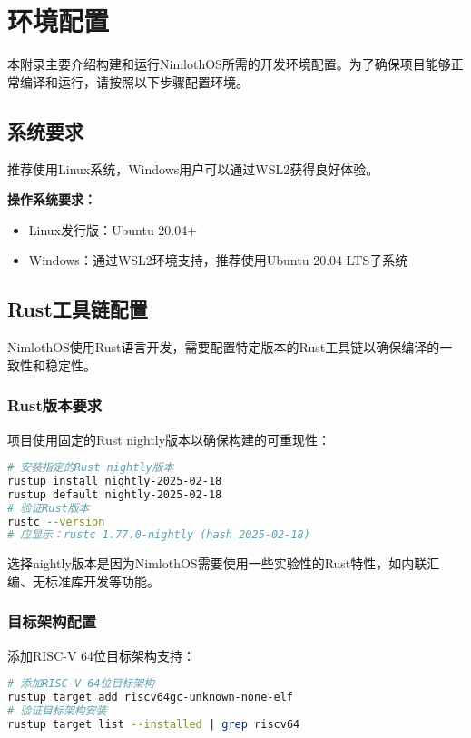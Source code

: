 \chapter{环境配置}

本附录主要介绍构建和运行NimlothOS所需的开发环境配置。为了确保项目能够正常编译和运行，请按照以下步骤配置环境。

\section{系统要求}

推荐使用Linux系统，Windows用户可以通过WSL2获得良好体验。

\textbf{操作系统要求：}
\begin{itemize}
    \item Linux发行版：Ubuntu 20.04+
    \item Windows：通过WSL2环境支持，推荐使用Ubuntu 20.04 LTS子系统
\end{itemize}

\section{Rust工具链配置}

NimlothOS使用Rust语言开发，需要配置特定版本的Rust工具链以确保编译的一致性和稳定性。

\subsection{Rust版本要求}

项目使用固定的Rust nightly版本以确保构建的可重现性：

\begin{lstlisting}[language=bash]
# 安装指定的Rust nightly版本
rustup install nightly-2025-02-18
rustup default nightly-2025-02-18
# 验证Rust版本
rustc --version
# 应显示：rustc 1.77.0-nightly (hash 2025-02-18)
\end{lstlisting}

选择nightly版本是因为NimlothOS需要使用一些实验性的Rust特性，如内联汇编、无标准库开发等功能。

\subsection{目标架构配置}

添加RISC-V 64位目标架构支持：

\begin{lstlisting}[language=bash]
# 添加RISC-V 64位目标架构
rustup target add riscv64gc-unknown-none-elf
# 验证目标架构安装
rustup target list --installed | grep riscv64
\end{lstlisting}

